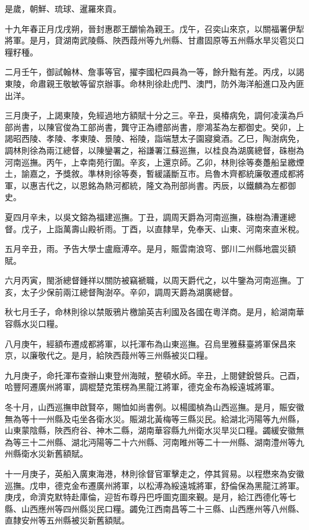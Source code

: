 \begin{pinyinscope}
是歲，朝鮮、琉球、暹羅來貢。

十九年春正月戊戌朔，晉封惠郡王釂愉為親王。戊午，召奕山來京，以關福署伊犁將軍。是月，貸湖南武陵縣、陜西葭州等九州縣、甘肅固原等五州縣水旱災雹災口糧籽種。

二月壬午，御試翰林、詹事等官，擢李國杞四員為一等，餘升黜有差。丙戌，以謁東陵，命肅親王敬敏等留京辦事。命林則徐赴虎門、澳門，防外海洋船進口及內匪出洋。

三月庚子，上謁東陵，免經過地方額賦十分之三。辛丑，吳椿病免，調何凌漢為戶部尚書，以陳官俊為工部尚書，龔守正為禮部尚書，廖鴻荃為左都御史。癸卯，上謁昭西陵、孝陵、孝東陵、景陵、裕陵，詣端慧太子園寢奠酒。乙巳，陶澍病免，調林則徐為兩江總督，以陳鑾署之，裕謙署江蘇巡撫，以桂良為湖廣總督，硃樹為河南巡撫。丙午，上幸南苑行圍。辛亥，上還京師。乙卯，林則徐等奏躉船呈繳煙土，諭嘉之，予獎敘。準林則徐等奏，暫緩議斷互市。烏魯木齊都統廉敬遷成都將軍，以惠吉代之，以恩銘為熱河都統，隆文為刑部尚書。丙辰，以鐵麟為左都御史。

夏四月辛未，以吳文鎔為福建巡撫。丁丑，調周天爵為河南巡撫，硃樹為漕運總督。戊子，上詣萬壽山殿祈雨。丁酉，以直隸旱，免奉天、山東、河南來直米稅。

五月辛丑，雨。予告大學士盧廕溥卒。是月，賑雲南浪穹、鄧川二州縣地震災額賦。

六月丙寅，閩浙總督鍾祥以關防被竊褫職，以周天爵代之，以牛鑒為河南巡撫。丁亥，太子少保前兩江總督陶澍卒。辛卯，調周天爵為湖廣總督。

秋七月壬子，命林則徐以禁販鴉片檄諭英吉利國及各國在粵洋商。是月，給湖南華容縣水災口糧。

八月庚午，經額布遷成都將軍，以托渾布為山東巡撫。召烏里雅蘇臺將軍保昌來京，以廉敬代之。是月，給陜西葭州等三州縣被災口糧。

九月庚子，命托渾布查辦山東登州海賊，整頓水師。辛丑，上閱健銳營兵。己酉，哈豐阿遷廣州將軍，調棍楚克策楞為黑龍江將軍，德克金布為綏遠城將軍。

冬十月，山西巡撫申啟賢卒，賜恤如尚書例。以楊國楨為山西巡撫。是月，賑安徽無為等十一州縣及屯坐各衛水災。賑湖北黃梅等三縣災民。給湖北沔陽等九州縣，山東蒙陰縣，陜西府谷、神木二縣，湖南華容縣九州衛水災旱災口糧。蠲緩安徽無為等三十二州縣、湖北沔陽等二十六州縣、河南睢州等二十一州縣、湖南澧州等九州縣衛水災新舊額賦。

十一月庚子，英船入廣東海港，林則徐督官軍擊走之，停其貿易。以程懋來為安徽巡撫。戊申，德克金布遷廣州將軍，以松溥為綏遠城將軍，舒倫保為黑龍江將軍。庚戌，命濟克默特赴庫倫，迎哲布尊丹巴呼圖克圖來覲。是月，給江西德化等七縣、山西應州等四州縣災民口糧。蠲免江西南昌等二十三縣、山西應州等八州縣、直隸安州等五州縣被災新舊額賦。


\end{pinyinscope}
